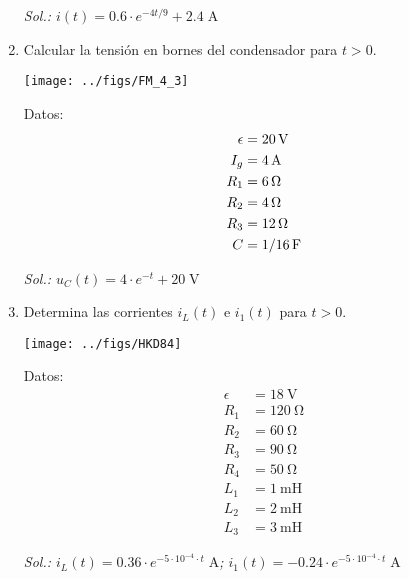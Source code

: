 \begin{enumerate}
\vspace{2mm}
\emph{Sol.:\; $i(t) = 0.6 \cdot e^{-4t/9} + 2.4 \;\si{\ampere}$}

\item Calcular la tensión en bornes del condensador para $t > 0$.

\begin{minipage}{0.5\textwidth}
  \texttt{[image: ../figs/FM\_4\_3]}
\end{minipage}
\hfill
\begin{minipage}{0.5\textwidth}
  Datos:
  \begin{align*}
    \epsilon &= \SI{20}{\volt}\\
    I_g &= \SI{4}{\ampere}\\
    R_1 &= \SI{6}{\ohm}\\
    R_2 &= \SI{4}{\ohm}\\
    R_3 &= \SI{12}{\ohm}\\
    C &= \SI[parse-numbers=false]{1/16}{\farad}      
  \end{align*}

\end{minipage}

\vspace{2mm}
\emph{Sol.:\; $u_C(t) = 4 \cdot e^{-t} + 20 \;\si{\volt}$}

\item Determina las corrientes $i_L(t)$ e $i_1(t)$ para $t > 0$.

\begin{minipage}{0.7\textwidth}
  \texttt{[image: ../figs/HKD84]}
\end{minipage}
\hfill
\begin{minipage}{0.3\textwidth}
  Datos:
  \begin{align*}
    \epsilon &= \SI{18}{\volt}\\
    R_1 &= \SI{120}{\ohm}\\
    R_2 &= \SI{60}{\ohm}\\
    R_3 &= \SI{90}{\ohm}\\
    R_4 &= \SI{50}{\ohm}\\
    L_1 &= \SI{1}{\milli\henry}\\
    L_2 &= \SI{2}{\milli\henry}\\
    L_3 &= \SI{3}{\milli\henry}
  \end{align*}
\end{minipage}

\vspace{2mm}
\emph{Sol.:\; $i_L(t) = 0.36 \cdot e^{-5 \cdot 10^{-4} \cdot t}\;\si{\ampere}$;\;
  $i_1(t) = -0.24 \cdot e^{-5 \cdot 10^{-4} \cdot t} \;\si{\ampere}$}


\end{enumerate}
